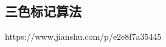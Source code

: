 \documentclass[../../../interview-questions.tex]{subfiles}
\begin{document}
\subsection{三色标记算法}

https://www.jianshu.com/p/e2e8f7a35445
\end{document}
